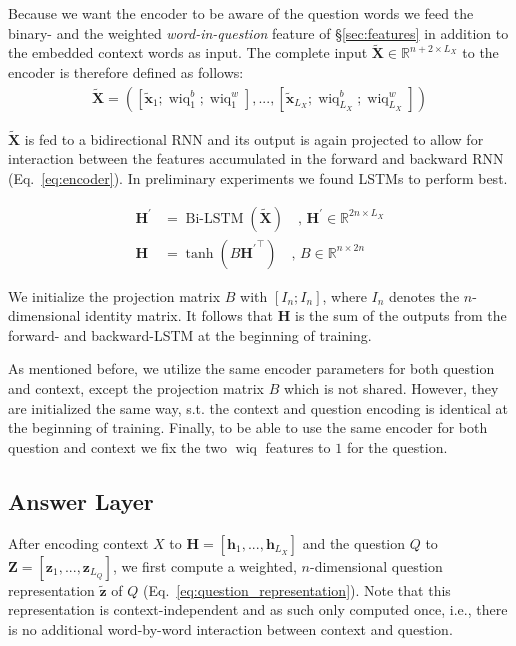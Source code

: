 \documentclass[11pt,a4paper]{article}
\begin{document}
Because we want the encoder to be aware of the question words we feed the binary- and the weighted \textit{word-in-question} feature of \S\ref{sec:features} in addition to the embedded context words as input. The complete input $\boldsymbol{\tilde{X}} \in \mathbb{R}^{n+2 \times L_X}$ to the encoder is therefore defined as follows:
\begin{align}
    \boldsymbol{\tilde{X}}=([\tilde{\boldsymbol{x}}_1;\operatorname{wiq}^b_1;\operatorname{wiq}^w_1], ... , [\tilde{\boldsymbol{x}}_{L_X};\operatorname{wiq}^b_{L_X};\operatorname{wiq}^w_{L_X}]) \nonumber
\end{align}

$\boldsymbol{\tilde{X}}$ is fed to a bidirectional RNN and its output is again projected to allow for interaction between the features accumulated in the forward and backward RNN (Eq.~\ref{eq:encoder}). In preliminary experiments we found LSTMs \cite{Hochreiter1997} to perform best.

\begin{align}
    \boldsymbol{H^\prime} &= \operatorname{Bi-LSTM}(\boldsymbol{\tilde{X}}) \quad,\, \boldsymbol{H^\prime} \in \mathbb{R}^{2n \times L_X} \nonumber \\
    \boldsymbol{H} &= \tanh(B \boldsymbol{H^\prime}^\top) \quad,\,  B \in \mathbb{R}^{n \times 2n} \label{eq:encoder}
\end{align}

We initialize the projection matrix $B$ with $[I_n;I_n]$, where $I_n$ denotes the $n$-dimensional identity matrix. It follows that $\boldsymbol{H}$ is the sum of the outputs from the forward- and backward-LSTM at the beginning of training.

As mentioned before, we utilize the same encoder parameters for both question and context, except the projection matrix $B$ which is not shared. However, they are initialized the same way, s.t. the context and question encoding is identical at the beginning of training. Finally, to be able to use the same encoder for both question and context we fix the two $\operatorname{wiq}$ features to $1$ for the question. 

\subsection{Answer Layer}

After encoding context $X$ to $\boldsymbol{H}= [\boldsymbol{h}_1, ..., \boldsymbol{h}_{L_X}]$ and the question $Q$ to $\boldsymbol{Z}= [\boldsymbol{z}_1, ..., \boldsymbol{z}_{L_Q}]$, we first compute a weighted, $n$-dimensional question representation $\boldsymbol{\tilde{z}}$ of $Q$ (Eq.~\ref{eq:question_representation}). Note that this representation is context-independent and as such only computed once, i.e., there is no additional word-by-word interaction between context and question.
\end{document}
